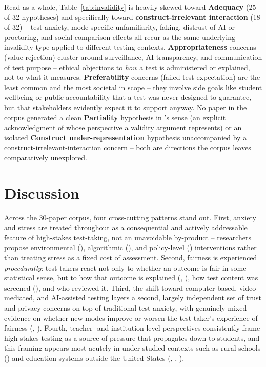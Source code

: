 \documentclass[11pt]{article}
\begin{document}
Read as a whole, Table~\ref{tab:invalidity} is heavily skewed toward \textbf{Adequacy} (25 of 32 hypotheses) and specifically toward \textbf{construct-irrelevant interaction} (18 of 32) -- test anxiety, mode-specific unfamiliarity, faking, distrust of AI or proctoring, and social-comparison effects all recur as the same underlying invalidity type applied to different testing contexts. \textbf{Appropriateness} concerns (value rejection) cluster around surveillance, AI transparency, and communication of test purpose -- ethical objections to \emph{how} a test is administered or explained, not to what it measures. \textbf{Preferability} concerns (failed test expectation) are the least common and the most societal in scope -- they involve side goals like student wellbeing or public accountability that a test was never designed to guarantee, but that stakeholders evidently expect it to support anyway. No paper in the corpus generated a clean \textbf{Partiality} hypothesis in \citeauthor{araneda2023dissertation}'s sense (an explicit acknowledgment of whose perspective a validity argument represents) or an isolated \textbf{Construct under-representation} hypothesis unaccompanied by a construct-irrelevant-interaction concern -- both are directions the corpus leaves comparatively unexplored.

\section{Discussion}

Across the 30-paper corpus, four cross-cutting patterns stand out. First, anxiety and stress are treated throughout as a consequential and actively addressable feature of high-stakes test-taking, not an unavoidable by-product -- researchers propose environmental (\citet{amsberry2018sound}), algorithmic (\citet{watson2026cat}), and policy-level (\citet{zhangw2024naplan}) interventions rather than treating stress as a fixed cost of assessment. Second, fairness is experienced \emph{procedurally}: test-takers react not only to whether an outcome is fair in some statistical sense, but to how that outcome is explained (\citet{feeney2022rejection}, \citet{stierwalt2000explanations}), how test content was screened (\citet{grand2013sensitivity}), and who reviewed it. Third, the shift toward computer-based, video-mediated, and AI-assisted testing layers a second, largely independent set of trust and privacy concerns on top of traditional test anxiety, with genuinely mixed evidence on whether new modes improve or worsen the test-taker's experience of fairness (\citet{zhang2023testtakers}, \citet{mukherjee2024proctoring}). Fourth, teacher- and institution-level perspectives consistently frame high-stakes testing as a source of pressure that propagates down to students, and this framing appears most acutely in under-studied contexts such as rural schools (\citet{steuart2024ruralteachers}) and education systems outside the United States (\citet{mccauley2021irish}, \citet{tseng2024taiwanese}, \citet{dang2024vstep}).
\end{document}
